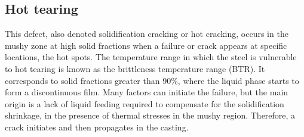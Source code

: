 \subsection*{Hot tearing} 
%
This defect, also denoted solidification cracking or hot cracking, occurs in the mushy zone 
at high solid fractions when a failure or crack appears at specific locations, the hot spots. 
The temperature range in which the steel is vulnerable to hot tearing is known as the brittleness 
temperature range (BTR). It corresponds to solid fractions greater than \num{90}\%, where the liquid 
phase starts to form a discontinuous film. Many factors can initiate the failure, but the main origin is a 
lack of liquid feeding required to compensate for the solidification shrinkage, in the presence of 
thermal stresses in the mushy region. Therefore, a crack initiates and then propagates in the casting. 
